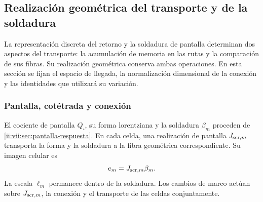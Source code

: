 


\subsection{Realización geométrica del transporte y de la soldadura}
\label{ii:vii:sec:realizacion-cartan}

La representación discreta del retorno y la soldadura de pantalla
determinan dos aspectos del transporte: la acumulación de memoria en
las rutas y la comparación de sus fibras. Su realización geométrica
conserva ambas operaciones. En esta sección se fijan el espacio de
llegada, la normalización dimensional de la conexión y las identidades
que utilizará su variación.

\subsubsection{Pantalla, cotétrada y conexión}

El cociente de pantalla \(Q_\square\), su forma lorentziana y la
soldadura \(\beta_m\) proceden de
\ref{ii:vii:sec:pantalla-respuesta}. En cada celda, una realización de
pantalla \(J_{{\rm scr},m}\) transporta la forma y la soldadura
a la fibra geométrica correspondiente. Su imagen celular es
\[
 e_m=J_{{\rm scr},m}\beta_m.
\]
La escala \(\ell_m\) permanece dentro de la soldadura. Los
cambios de marco actúan sobre \(J_{{\rm scr},m}\), la conexión
y el transporte de las celdas conjuntamente.

